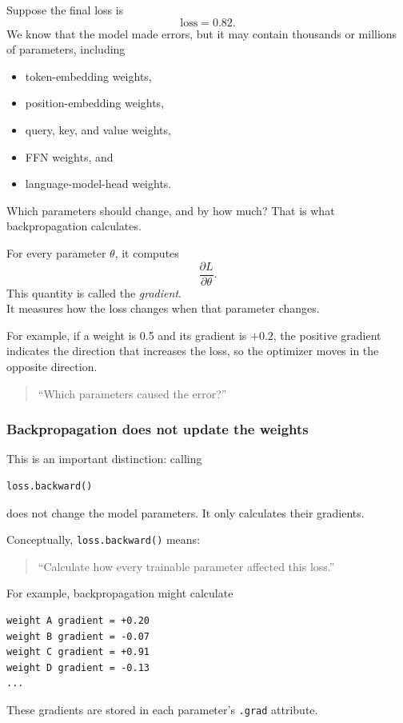 Suppose the final loss is
\[
  \text{loss}=0.82.
\]
We know that the model made errors, but it may contain thousands or millions
of parameters, including
\begin{itemize}
  \setlength{\itemsep}{0pt}
  \setlength{\parsep}{0pt}
  \item token-embedding weights,
  \item position-embedding weights,
  \item query, key, and value weights,
  \item FFN weights, and
  \item language-model-head weights.
\end{itemize}

Which parameters should change, and by how much? That is what
backpropagation calculates.

For every parameter \(\theta\), it computes
\[
  \frac{\partial L}{\partial\theta}.
\]
This quantity is called the \emph{gradient}. \\ 

It measures how the loss changes when that parameter changes.

For example, if a weight is 0.5 and its gradient is \(+0.2\), the positive
gradient indicates the direction that increases the loss, so the optimizer
moves in the opposite direction.

\begin{quote}
  ``Which parameters caused the error?''
\end{quote}

\subsubsection*{Backpropagation does not update the weights}

This is an important distinction: calling
\begin{lstlisting}[style=shadedpython]
loss.backward()
\end{lstlisting}
does not change the model parameters. It only calculates their gradients.

Conceptually, \texttt{loss.backward()} means:
\begin{quote}
  ``Calculate how every trainable parameter affected this loss.''
\end{quote}

For example, backpropagation might calculate
\begin{lstlisting}[style=shadedpython,language={}]
weight A gradient = +0.20
weight B gradient = -0.07
weight C gradient = +0.91
weight D gradient = -0.13
...
\end{lstlisting}
These gradients are stored in each parameter's \texttt{.grad} attribute. \\

